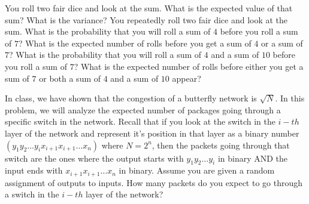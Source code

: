 \documentclass[12pt,oneside]{article}
\begin{document}
\newpage
\begin{problem}{25}
\bparts
You roll two fair dice and look at the sum. What is the expected value of that sum? 
What is the variance?
You repeatedly roll two fair dice and look at the sum. What is the probability that you will roll a sum of $4$ before you roll a sum of $7$?
What is the expected number of rolls before you get a sum of $4$ or a sum of $7$?
What is the probability that you will roll a sum of $4$ and a sum of $10$ before you roll a sum of $7$?
What is the expected number of rolls before either you get a sum of $7$ or both a sum of $4$ and a sum of $10$ appear?
\eparts
\end{problem}

\newpage
\begin{problem}{20}
In class, we have shown that the congestion of a butterfly network is $\sqrt{N}$. In this problem, we will analyze the expected number of packages going through a specific switch in the network. Recall that if you look at the switch in the $i-th$ layer of the network and represent it's position in that layer as a binary number $(y_1y_2\ldots y_ix_{i+1}x_{i+1}\ldots x_{n})$ where $N=2^n$, then the packets going through that switch are the ones where the output starts with $y_1y_2\ldots y_i$ in binary AND the input ends with $x_{i+1}x_{i+1}\ldots x_{n}$ in binary.
Assume you are given a random assignment of outputs to inputs. How many packets do you expect to go through a switch in the $i-th$ layer of the network?
\end{problem}
\end{document}
